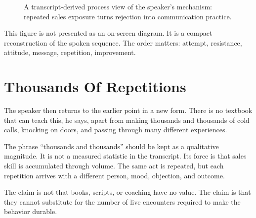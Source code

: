 \begin{figure}
\centering
{}
\caption{A transcript-derived process view of the speaker's mechanism: repeated sales exposure turns rejection into communication practice.}
\end{figure}

This figure is not presented as an on-screen diagram. It is a compact reconstruction of the spoken sequence. The order matters: attempt, resistance, attitude, message, repetition, improvement.

\section{Thousands Of Repetitions}

The speaker then returns to the earlier point in a new form. There is no textbook that can teach this, he says, apart from making thousands and thousands of cold calls, knocking on doors, and passing through many different experiences.

The phrase ``thousands and thousands'' should be kept as a qualitative magnitude. It is not a measured statistic in the transcript. Its force is that sales skill is accumulated through volume. The same act is repeated, but each repetition arrives with a different person, mood, objection, and outcome.

\begin{remark}
The claim is not that books, scripts, or coaching have no value. The claim is that they cannot substitute for the number of live encounters required to make the behavior durable.
\end{remark}

